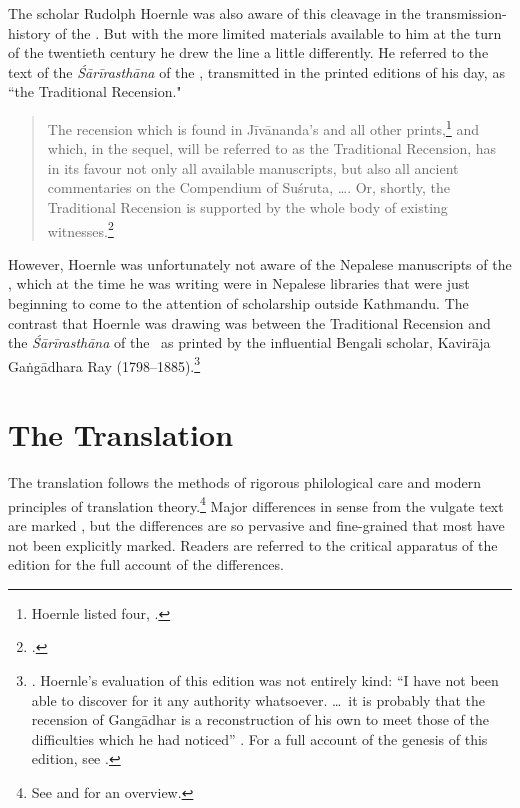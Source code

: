 The scholar Rudolph Hoernle was also aware of this cleavage in the
transmission-history of the \SS.  But with the more limited materials
available to him at the turn of the twentieth century he drew the line
a little differently.  He referred to the text of the
\emph{Śārīrasthāna} of the \SS, transmitted in the printed editions of
his day, as “the Traditional Recension."
\begin{quote}
    The recension which is found in Jīvānanda's and all other
prints,\footnote{Hoernle listed four,
    \cites{bhat-1889,gupt-1835,govi-1901,vira-nd}.} and which, in the
    sequel, will be referred to as the Traditional Recension, has in
    its favour not only all available manuscripts, but also all
    ancient commentaries on the Compendium of Suśruta, \ldots.  Or,
    shortly, the Traditional Recension is supported by the whole body
    of existing witnesses.\footcite[68]{hoer-1907}
\end{quote}
However, Hoernle was unfortunately not aware of the Nepalese
manuscripts of the \SS, which at the time he was writing were in
Nepalese libraries that were just beginning to come to the attention
of scholarship outside Kathmandu.  The contrast that Hoernle was
drawing was between the Traditional Recension and the
\emph{Śārīrasthāna} of the \CS\ as printed by the influential Bengali
scholar, Kavirāja Gaṅgādhara Ray
(1798--1885).\footnote{\cite{gang-1868}.  Hoernle's evaluation of this
    edition was not entirely kind: “I have not been able to discover for
    it any authority whatsoever. \ldots\ it is probably that the recension
    of Gangādhar is a reconstruction of his own to meet those of the
    difficulties which he had noticed” \citep[70]{hoer-1907}.  For a full
    account of the genesis of this edition, see \cite{pecc-2022}.}

    
\section{The Translation}    

The translation follows the methods of rigorous philological care and
modern principles of translation theory.\footnote{See
    \cite[intro.]{wuja-2003} and \cite[81--83]{wuja-2021} for an
    overview.}  Major differences in sense from the vulgate text are
    marked  , but the differences are so pervasive
    and fine-grained that most have not been explicitly marked.  Readers are 
    referred to the critical apparatus of the edition for the full account of the 
    differences. 

